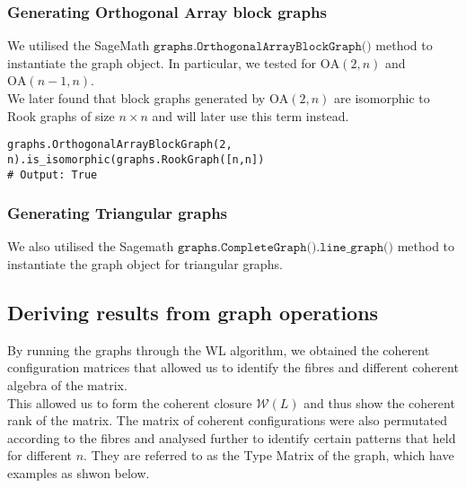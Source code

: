 \documentclass[12pt]{article}
\begin{document}
\subsubsection{Generating Orthogonal Array block graphs}
We utilised the SageMath \(\texttt{graphs.OrthogonalArrayBlockGraph()}\) \cite{sagemath_OA} method to instantiate the graph object. In particular, we tested for $\text{OA}(2, n)$ and $\text{OA}(n-1,n)$. \\
We later found that block graphs generated by $\text{OA}(2, n)$ are isomorphic to Rook graphs of size $n\times n$ and will later use this term instead.
\begin{verbatim}
graphs.OrthogonalArrayBlockGraph(2, n).is_isomorphic(graphs.RookGraph([n,n])
# Output: True
\end{verbatim}


\subsubsection{Generating Triangular graphs}
We also utilised the Sagemath \(\texttt{graphs.CompleteGraph().line\_graph()}\) \cite{sagemath_complete_graph}\cite{sagemath_line_graph} method to instantiate the graph object for triangular graphs. 

\subsection{Deriving results from graph operations}
By running the graphs through the WL algorithm, we obtained the coherent configuration matrices that allowed us to identify the fibres \cite{gary} and different coherent algebra of the matrix. \\
This allowed us to form the coherent closure $\mathcal{W}(L)$ and thus show the coherent rank of the matrix. The matrix of coherent configurations were also permutated according to the fibres and analysed further to identify certain patterns that held for different $n$. They are referred to as the Type Matrix of the graph, which have examples as shwon below.
\end{document}
